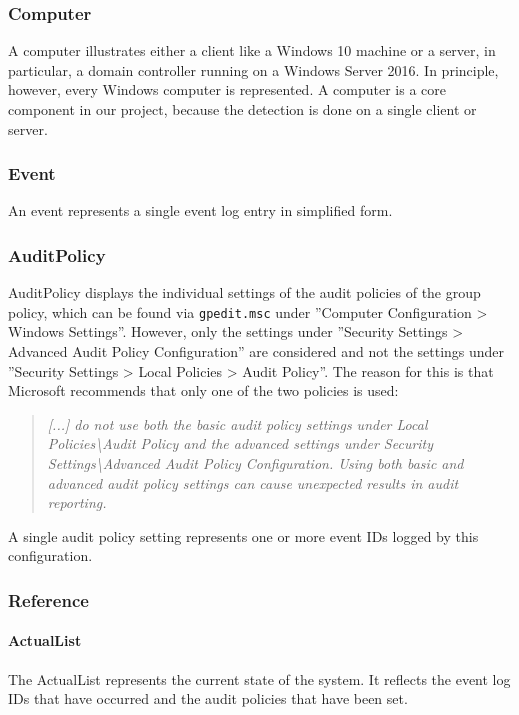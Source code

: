\subsubsection{Computer}
A computer illustrates either a client like a Windows 10 machine or a server, in particular, a domain controller running on a Windows Server 2016. In principle, however, every Windows computer is represented. A computer is a core component in our project, because the detection is done on a single client or server. 

\subsubsection{Event}
An event represents a single event log entry in simplified form.

\subsubsection{AuditPolicy}\label{DomainModelAuditPolicy}
AuditPolicy displays the individual settings of the audit policies of the group policy, which can be found via \lstinline|gpedit.msc| under ''Computer Configuration > Windows Settings''. However, only the settings under ''Security Settings > Advanced Audit Policy Configuration'' are considered and not the settings under ''Security Settings > Local Policies > Audit Policy''. The reason for this is that Microsoft recommends that only one of the two policies is used:
\begin{quotation}
    \textit{[...] do not use both the basic audit policy settings under Local Policies\textbackslash Audit Policy and the advanced settings under Security Settings\textbackslash Advanced Audit Policy Configuration. Using both basic and advanced audit policy settings can cause unexpected results in audit reporting.} \cite{AdvancedSecurityAuditing}
\end{quotation}
A single audit policy setting represents one or more event IDs logged by this configuration.

\subsubsection{Reference}
\paragraph{ActualList}
The ActualList represents the current state of the system. It reflects the event log IDs that have occurred and the audit policies that have been set.

